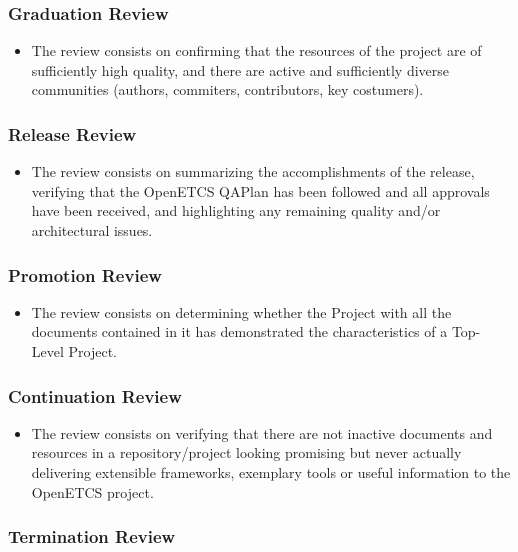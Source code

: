 \documentclass{template/openetcs_article}
\begin{document}
\subsubsection{Graduation Review}

\begin{itemize}
\item The review consists on confirming that the resources of the project are of sufficiently high quality, and there are active and sufficiently diverse communities (authors, commiters, contributors, key costumers). 
\end{itemize}

\subsubsection{Release Review}

\begin{itemize}
\item The review consists on summarizing the accomplishments of the release, verifying that the OpenETCS QAPlan has been followed and all approvals have been received, and highlighting any remaining quality and/or architectural issues.
\end{itemize}

\subsubsection{Promotion Review}

\begin{itemize}
\item The review consists on determining whether the Project with all the documents contained in it has demonstrated the characteristics of a Top-Level Project. 
\end{itemize}

\subsubsection{Continuation Review}

\begin{itemize}
\item The review consists on verifying that there are not inactive documents and resources in a repository/project looking promising but never actually delivering extensible frameworks, exemplary tools or useful information to the OpenETCS project. 
\end{itemize}

\subsubsection{Termination Review}
\end{document}
